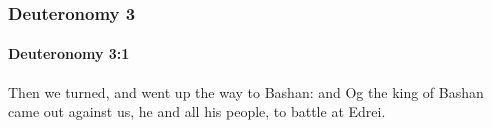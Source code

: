 	\subsubsection{Deuteronomy 3} %
		\label{DEUTERONOMY-3}

		\paragraph{Deuteronomy 3:1} %
			\label{DEUTERONOMY-3-1}

			Then we turned, and went up the way to Bashan: and Og the king of Bashan came out against us, he and all his people, to battle at Edrei.


